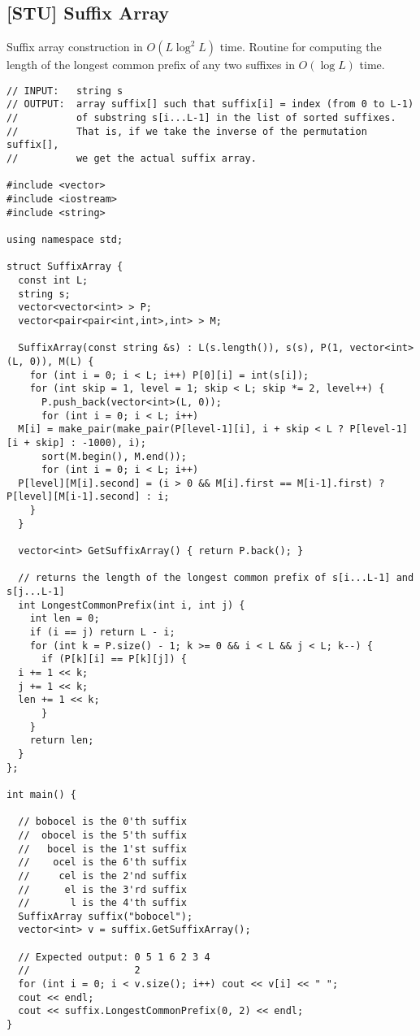 \documentclass[10pt, a4, oneside]{article}
\begin{document}
\subsection{[STU] Suffix Array}
Suffix array construction in $O(L \log^2 L)$ time.
Routine for computing the length of the longest common
prefix of any two suffixes in $O(\log L)$ time.
\begin{verbatim}
// INPUT:   string s
// OUTPUT:  array suffix[] such that suffix[i] = index (from 0 to L-1)
//          of substring s[i...L-1] in the list of sorted suffixes.
//          That is, if we take the inverse of the permutation suffix[],
//          we get the actual suffix array.

#include <vector>
#include <iostream>
#include <string>

using namespace std;

struct SuffixArray {
  const int L;
  string s;
  vector<vector<int> > P;
  vector<pair<pair<int,int>,int> > M;

  SuffixArray(const string &s) : L(s.length()), s(s), P(1, vector<int>(L, 0)), M(L) {
    for (int i = 0; i < L; i++) P[0][i] = int(s[i]);
    for (int skip = 1, level = 1; skip < L; skip *= 2, level++) {
      P.push_back(vector<int>(L, 0));
      for (int i = 0; i < L; i++) 
  M[i] = make_pair(make_pair(P[level-1][i], i + skip < L ? P[level-1][i + skip] : -1000), i);
      sort(M.begin(), M.end());
      for (int i = 0; i < L; i++) 
  P[level][M[i].second] = (i > 0 && M[i].first == M[i-1].first) ? P[level][M[i-1].second] : i;
    }    
  }

  vector<int> GetSuffixArray() { return P.back(); }

  // returns the length of the longest common prefix of s[i...L-1] and s[j...L-1]
  int LongestCommonPrefix(int i, int j) {
    int len = 0;
    if (i == j) return L - i;
    for (int k = P.size() - 1; k >= 0 && i < L && j < L; k--) {
      if (P[k][i] == P[k][j]) {
  i += 1 << k;
  j += 1 << k;
  len += 1 << k;
      }
    }
    return len;
  }
};

int main() {

  // bobocel is the 0'th suffix
  //  obocel is the 5'th suffix
  //   bocel is the 1'st suffix
  //    ocel is the 6'th suffix
  //     cel is the 2'nd suffix
  //      el is the 3'rd suffix
  //       l is the 4'th suffix
  SuffixArray suffix("bobocel");
  vector<int> v = suffix.GetSuffixArray();
  
  // Expected output: 0 5 1 6 2 3 4
  //                  2
  for (int i = 0; i < v.size(); i++) cout << v[i] << " ";
  cout << endl;
  cout << suffix.LongestCommonPrefix(0, 2) << endl;
}
\end{verbatim}
\end{document}
